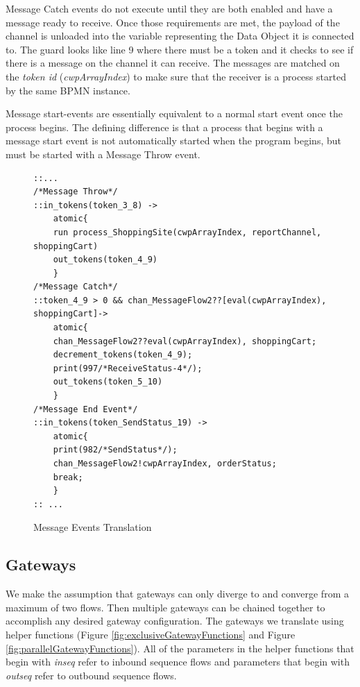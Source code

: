 \documentclass[11pt,twocolumn]{article}
\begin{document}
Message Catch events do not execute until they are both enabled and have a message ready to receive. Once those requirements are met, the payload of the channel is unloaded into the variable representing the Data Object it is connected to. The guard looks like line 9 where there must be a token and it checks to see if there is a message on the channel it can receive. The messages are matched on the \emph{token id} (\emph{cwpArrayIndex}) to make sure that the receiver is a process started by the same BPMN instance.

Message start-events are essentially equivalent to a normal start event once the process begins. The defining difference is that a process that begins with a message start event is not automatically started when the program begins, but must be started with a Message Throw event.

\begin{figure}
\begin{lstlisting}
::...
/*Message Throw*/
::in_tokens(token_3_8) -> 
	atomic{
	run process_ShoppingSite(cwpArrayIndex, reportChannel, shoppingCart)
	out_tokens(token_4_9)
	}
/*Message Catch*/
::token_4_9 > 0 && chan_MessageFlow2??[eval(cwpArrayIndex), shoppingCart]->
	atomic{
	chan_MessageFlow2??eval(cwpArrayIndex), shoppingCart;
	decrement_tokens(token_4_9);
	print(997/*ReceiveStatus-4*/);
	out_tokens(token_5_10)
	}
/*Message End Event*/
::in_tokens(token_SendStatus_19) -> 
	atomic{
	print(982/*SendStatus*/);
	chan_MessageFlow2!cwpArrayIndex, orderStatus;
	break;
	}
:: ...
\end{lstlisting}

\caption{Message Events Translation}
 \label{fig:messageTranslation}
\end{figure}



\subsection{Gateways}\label{sec:gateways}

We make the assumption that gateways can only diverge to and converge from a maximum of two flows. Then multiple gateways can be chained together to accomplish any desired gateway configuration. The gateways we translate using helper functions (Figure \ref{fig:exclusiveGatewayFunctions} and Figure \ref{fig:parallelGatewayFunctions}). All of the parameters in the helper functions that begin with \emph{inseq} refer to inbound sequence flows and parameters that begin with \emph{outseq} refer to outbound sequence flows.
\end{document}
